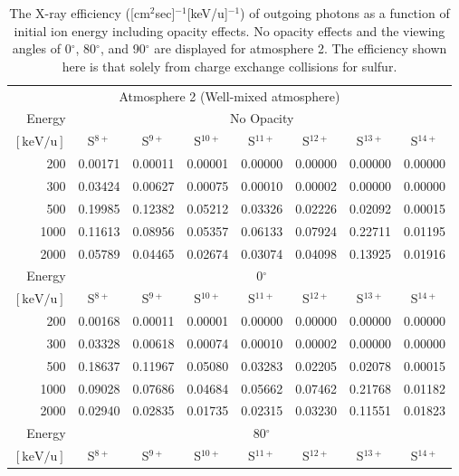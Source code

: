\begin{table}[ht]
    \centering
    \caption{The X-ray efficiency ([cm$^2$sec]$^{-1}$[keV/u]$^{-1}$) of outgoing photons as a function of initial ion energy including opacity effects. No opacity effects and the viewing angles of 0$^\circ$, 80$^\circ$, and 90$^\circ$ are displayed for atmosphere 2. The efficiency shown here is that solely from charge exchange collisions for sulfur.}
    \begin{tabular}{r|c|c|c|c|c|c|c}
    \multicolumn{8}{c}{Atmosphere 2 (Well-mixed atmosphere)} \\ \cline{2-8}
    Energy & \multicolumn{7}{c}{No Opacity} \\ \cline{2-8}
    $\mathrm{[keV/u]}$ & S$^{8+}$ & S$^{9+}$ & S$^{10+}$ & S$^{11+}$ & S$^{12+}$ & S$^{13+}$ & S$^{14+}$ \\ \cline{1-8}
    200   & 0.00171 & 0.00011 & 0.00001 & 0.00000 & 0.00000 & 0.00000 & 0.00000 \\
    300   & 0.03424 & 0.00627 & 0.00075 & 0.00010 & 0.00002 & 0.00000 & 0.00000 \\
    500   & 0.19985 & 0.12382 & 0.05212 & 0.03326 & 0.02226 & 0.02092 & 0.00015 \\
    1000  & 0.11613 & 0.08956 & 0.05357 & 0.06133 & 0.07924 & 0.22711 & 0.01195 \\
    2000  & 0.05789 & 0.04465 & 0.02674 & 0.03074 & 0.04098 & 0.13925 & 0.01916 \\ \cline{1-8}
    Energy & \multicolumn{7}{c}{0$^\circ$} \\ \cline{2-8}
    $\mathrm{[keV/u]}$ & S$^{8+}$ & S$^{9+}$ & S$^{10+}$ & S$^{11+}$ & S$^{12+}$ & S$^{13+}$ & S$^{14+}$ \\ \cline{1-8}
    200   & 0.00168 & 0.00011 & 0.00001 & 0.00000 & 0.00000 & 0.00000 & 0.00000 \\
    300   & 0.03328 & 0.00618 & 0.00074 & 0.00010 & 0.00002 & 0.00000 & 0.00000 \\
    500   & 0.18637 & 0.11967 & 0.05080 & 0.03283 & 0.02205 & 0.02078 & 0.00015 \\
    1000  & 0.09028 & 0.07686 & 0.04684 & 0.05662 & 0.07462 & 0.21768 & 0.01182 \\
    2000  & 0.02940 & 0.02835 & 0.01735 & 0.02315 & 0.03230 & 0.11551 & 0.01823 \\ \cline{1-8}
    Energy & \multicolumn{7}{c}{80$^\circ$} \\ \cline{2-8}
    $\mathrm{[keV/u]}$ & S$^{8+}$ & S$^{9+}$ & S$^{10+}$ & S$^{11+}$ & S$^{12+}$ & S$^{13+}$ & S$^{14+}$ \\ \cline{1-8}

\end{tabular}
\end{table}
